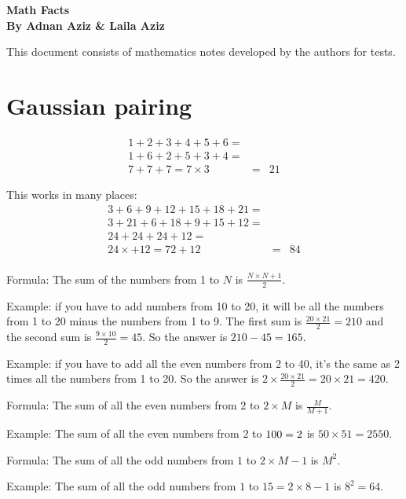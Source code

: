 \documentclass[fullpage,twocolumn]{article}
\begin{document}

\begin{center}
{\Large \bf Math Facts} \\
{\bf By Adnan Aziz \& Laila Aziz}

\end{center}


This document consists of mathematics notes developed by the authors for
tests.



\section{Gaussian pairing}
{\color{blue}
\begin{eqnarray*}
1 + 2 + 3 + 4 + 5 + 6 = \\
1 + 6 + 2 + 5 + 3 + 4 = \\
7 + 7 + 7 = 7 \times 3 & = & 21 
\end{eqnarray*}
}

This works in many places:
\begin{eqnarray*}
3 + 6 + 9 + 12 + 15 + 18 + 21 = \\
3 + 21 + 6 + 18 + 9 + 15 + 12 = \\
24 + 24 + 24 + 12 = \\
24\times + 12 = 72 + 12 & = & 84 \\
\end{eqnarray*}

Formula: The sum of the numbers from 1 to $N$ is $\frac{N \times {N+1}}{2}$.

Example: if you have to add numbers from 10 to 20, it will
be all the numbers from 1 to 20 minus the numbers from 1 to 9.
The first sum is $\frac{20 \times 21}{2} = 210$ and the second
sum is $\frac{9 \times 10 }{2} = 45$. So the answer
is $210 - 45 = 165$.

Example: if you have to add all the even numbers from 2 to 40,
it's the same as 2 times all the numbers from 1 to 20.
So the answer is $2 \times \frac{20\times 21}{2} = 20\times 21 = 420$.

Formula: The sum of all the even numbers from $2$ to $2\times M$ is $\frac{M}{M+1}$.

Example: The sum of all the even numbers from $2$ to $100 = 2 \time 50$ is 
$50 \times 51 =  2550$.

Formula: The sum of all the odd numbers from $1$ to $2 \times M  - 1$ is $M^2$.

Example: The sum of all the odd numbers from $1$ to $15 = 2 \times 8 - 1 $ is 
$8^2 = 64$.
\end{document}
